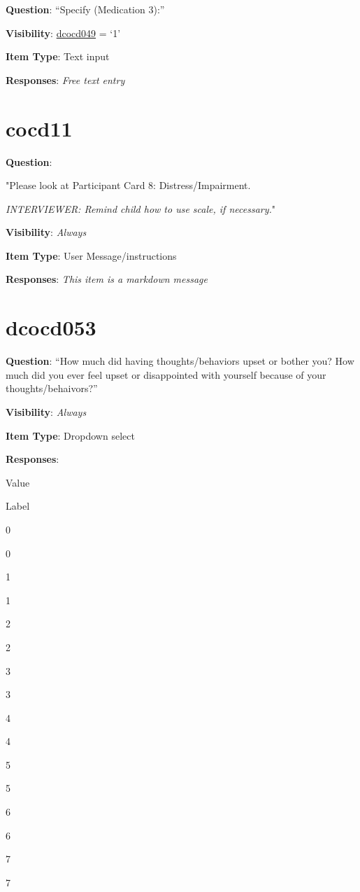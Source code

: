 \documentclass[]{book}
\begin{document}
\textbf{Question}: ``Specify (Medication 3):''

\textbf{Visibility}: \protect\hyperlink{dcocd049}{dcocd049} = `1'

\textbf{Item Type}: Text input

\textbf{Responses}: \emph{Free text entry}

\hypertarget{cocd11}{%
\section{cocd11}\label{cocd11}}

\textbf{Question}:

"Please look at Participant Card 8: Distress/Impairment.

\emph{INTERVIEWER: Remind child how to use scale, if necessary.}"

\textbf{Visibility}: \emph{Always}

\textbf{Item Type}: User Message/instructions

\textbf{Responses}: \emph{This item is a markdown message}

\hypertarget{dcocd053}{%
\section{dcocd053}\label{dcocd053}}

\textbf{Question}: ``How much did having thoughts/behaviors upset or bother you? How much did you ever feel upset or disappointed with yourself because of your thoughts/behaivors?''

\textbf{Visibility}: \emph{Always}

\textbf{Item Type}: Dropdown select

\textbf{Responses}:

Value

Label

0

0

1

1

2

2

3

3

4

4

5

5

6

6

7

7
\end{document}
